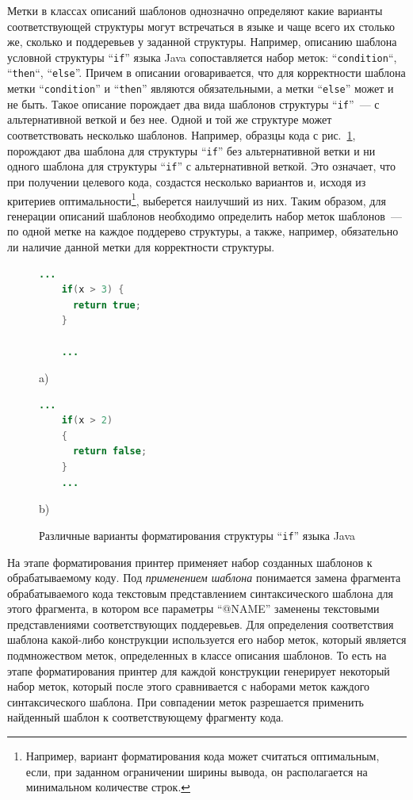 Метки в классах описаний шаблонов однозначно определяют какие варианты соответствующей структуры могут встречаться в языке и чаще всего их столько же, сколько и поддеревьев у заданной структуры. Например, описанию шаблона условной структуры ``\lstinline{if}'' языка Java сопоставляется набор меток: ``\lstinline{condition}``, ``\lstinline{then}``, ``\lstinline{else}''. Причем в описании оговаривается, что для корректности шаблона метки ``\lstinline{condition}'' и ``\lstinline{then}'' являются обязательными, а метки ``\lstinline{else}'' может и не быть. Такое описание порождает два вида шаблонов структуры ``\lstinline{if}''~--- с альтернативной веткой и без нее. Одной и той же структуре может соответствовать несколько шаблонов. Например, образцы кода с рис.~\ref{ifVariants}, порождают два шаблона для структуры ``\lstinline{if}'' без альтернативной ветки и ни одного шаблона для структуры ``\lstinline{if}'' с альтернативной веткой. Это означает, что при получении целевого кода, создастся несколько вариантов и, исходя из критериев оптимальности\footnote{Например, вариант форматирования кода может считаться оптимальным, если, при заданном ограничении ширины вывода, он располагается на минимальном количестве строк.}, выберется наилучший из них. Таким образом, для генерации описаний шаблонов необходимо определить набор меток шаблонов~--- по одной метке на каждое поддерево структуры, а также, например, обязательно ли наличие данной метки для корректности структуры.

\begin{figure}[ht]
\noindent\begin{minipage}{.45\textwidth}
    \begin{lstlisting}[language=Java]
    ...
    if(x > 3) {
      return true;
    }
    
    ...
    \end{lstlisting}
\caption*{a)}    
\end{minipage}\hfill
\begin{minipage}{.45\textwidth}
    \begin{lstlisting}[language=Java]
    ...
    if(x > 2) 
    { 
      return false; 
    }
    ...
    \end{lstlisting}
\caption*{b)}    
\end{minipage}
\caption{Различные варианты форматирования структуры ``\lstinline{if}'' языка Java}    
\label{ifVariants}
\end{figure}

На этапе форматирования принтер применяет набор созданных шаблонов к обрабатываемому коду. Под \textit{применением шаблона} понимается замена фрагмента обрабатываемого кода текстовым представлением синтаксического шаблона для этого фрагмента, в котором все параметры ``@NAME'' заменены текстовыми представлениями соответствующих поддеревьев. Для определения соответствия шаблона какой-либо конструкции используется его набор меток, который является подмножеством меток, определенных в классе описания шаблонов. То есть на этапе форматирования принтер для каждой конструкции генерирует некоторый набор меток, который после этого сравнивается с наборами меток каждого синтаксического шаблона. При совпадении меток разрешается применить найденный шаблон к соответствующему фрагменту кода.


